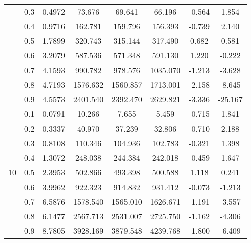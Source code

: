 \documentclass[11pt,a4paper]{report}
\begin{document}
\begin{longtable}{ | c | c || c | c | c | c | c | c | }
 & 0.3 & 0.4972 & 73.676 & 69.641 & 66.196 & -0.564 & 1.854 \\
 & 0.4 & 0.9716 & 162.781 & 159.796 & 156.393 & -0.739 & 2.140 \\
 & 0.5 & 1.7899 & 320.743 & 315.144 & 317.490 & 0.682 & 0.581 \\
 & 0.6 & 3.2079 & 587.536 & 571.348 & 591.130 & 1.220 & -0.222 \\
 & 0.7 & 4.1593 & 990.782 & 978.576 & 1035.070 & -1.213 & -3.628 \\
 & 0.8 & 4.7193 & 1576.632 & 1560.857 & 1713.001 & -2.158 & -8.645 \\
 & 0.9 & 4.5573 & 2401.540 & 2392.470 & 2629.821 & -3.336 & -25.167 \\
 \hline
\multirow{9}{*}{10} & 0.1 & 0.0791 & 10.266 & 7.655 & 5.459 & -0.715 & 1.841 \\
 & 0.2 & 0.3337 & 40.970 & 37.239 & 32.806 & -0.710 & 2.188 \\
 & 0.3 & 0.8108 & 110.346 & 104.936 & 102.783 & -0.321 & 1.398 \\
 & 0.4 & 1.3072 & 248.038 & 244.384 & 242.018 & -0.459 & 1.647 \\
 & 0.5 & 2.3953 & 502.866 & 493.398 & 500.588 & 1.118 & 0.241 \\
 & 0.6 & 3.9962 & 922.323 & 914.832 & 931.412 & -0.073 & -1.213 \\
 & 0.7 & 6.5876 & 1578.540 & 1565.010 & 1626.671 & -1.191 & -3.557 \\
 & 0.8 & 6.1477 & 2567.713 & 2531.007 & 2725.750 & -1.162 & -4.306 \\
 & 0.9 & 8.7805 & 3928.169 & 3879.548 & 4239.768 & -1.800 & -6.409 \\
 \hline
\hline
\end{longtable}
\end{document}
